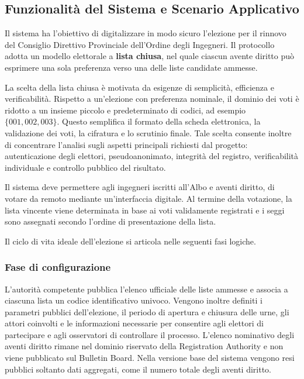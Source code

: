 \documentclass[12pt,a4paper]{article}
\begin{document}
\subsection{Funzionalit\`a del Sistema e Scenario Applicativo}

Il sistema ha l'obiettivo di digitalizzare in modo sicuro l'elezione per il rinnovo del Consiglio Direttivo Provinciale dell'Ordine degli Ingegneri. Il protocollo adotta un modello elettorale a \textbf{lista chiusa}, nel quale ciascun avente diritto pu\`o esprimere una sola preferenza verso una delle liste candidate ammesse.

La scelta della lista chiusa \`e motivata da esigenze di semplicit\`a, efficienza e verificabilit\`a. Rispetto a un'elezione con preferenza nominale, il dominio dei voti \`e ridotto a un insieme piccolo e predeterminato di codici, ad esempio $\{001, 002, 003\}$. Questo semplifica il formato della scheda elettronica, la validazione dei voti, la cifratura e lo scrutinio finale. Tale scelta consente inoltre di concentrare l'analisi sugli aspetti principali richiesti dal progetto: autenticazione degli elettori, pseudoanonimato, integrit\`a del registro, verificabilit\`a individuale e controllo pubblico del risultato.

Il sistema deve permettere agli ingegneri iscritti all'Albo e aventi diritto, di votare da remoto mediante un'interfaccia digitale. Al termine della votazione, la lista vincente viene determinata in base ai voti validamente registrati e i seggi sono assegnati secondo l'ordine di presentazione della lista.

Il ciclo di vita ideale dell'elezione si articola nelle seguenti fasi logiche.

\subsubsection*{Fase di configurazione}

L'autorit\`a competente pubblica l'elenco ufficiale delle liste ammesse e associa a ciascuna lista un codice identificativo univoco. Vengono inoltre definiti i parametri pubblici dell'elezione, il periodo di apertura e chiusura delle urne, gli attori coinvolti e le informazioni necessarie per consentire agli elettori di partecipare e agli osservatori di controllare il processo. L'elenco nominativo degli aventi diritto rimane nel dominio riservato della Registration Authority e non viene pubblicato sul Bulletin Board. Nella versione base del sistema vengono resi pubblici soltanto dati aggregati, come il numero totale degli aventi diritto.
\end{document}
